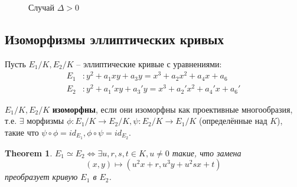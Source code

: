 \documentclass[11pt]{exam}
\newtheorem{theorem}{Theorem}[section]
\theoremstyle{definition}
\begin{document}
{	\begin{figure}[h!]
			\caption{Случай $\Delta > 0$}
			\centering
		\end{figure}

\subsection{Изоморфизмы эллиптических кривых}
Пусть $E_1/K, E_2/K$ -- эллиптические кривые с уравнениями:
\begin{equation}
	\begin{split}
		E_1&: y^2+a_1xy + a_3y = x^3 + a_2x^2 + a_4x + a_6 \\
		E_2&: y^2+a_1'xy + a_3'y = x^3 + a_2'x^2 + a_4'x + a_6'
	\end{split}
\end{equation}

$E_1/K, E_2/K$ \textbf{изоморфны}, если они изоморфны как проективные многообразия, т.е. $\exists$ морфизмы $\phi: E_1/K \to E_2/K, \psi: E_2/K \to E_1/K$ (определённые над $K$), такие что $\psi \circ \phi = id_{E_1}, \phi \circ \psi = id_{E_2}$.

\begin{theorem}
	$E_1 \simeq E_2 \iff \exists u,r,s,t \in K, u \neq 0$ такие, что замена
\begin{equation}
	\label{eq:isom}
	(x,y) \mapsto (u^2x+r, u^3y+ u^2sx+t)
\end{equation}
преобразует кривую $E_1$ в $E_2$.
\end{theorem}

}
\end{document}
